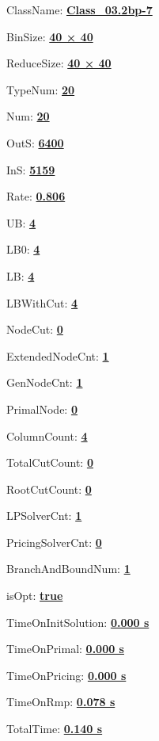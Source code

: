 \documentclass[11pt]{article}
\begin{document}
\pagestyle{empty}


ClassName: \underline{\textbf{Class_03.2bp-7}}
\par
BinSize: \underline{\textbf{40 × 40}}
\par
ReduceSize: \underline{\textbf{40 × 40}}
\par
TypeNum: \underline{\textbf{20}}
\par
Num: \underline{\textbf{20}}
\par
OutS: \underline{\textbf{6400}}
\par
InS: \underline{\textbf{5159}}
\par
Rate: \underline{\textbf{0.806}}
\par
UB: \underline{\textbf{4}}
\par
LB0: \underline{\textbf{4}}
\par
LB: \underline{\textbf{4}}
\par
LBWithCut: \underline{\textbf{4}}
\par
NodeCut: \underline{\textbf{0}}
\par
ExtendedNodeCnt: \underline{\textbf{1}}
\par
GenNodeCnt: \underline{\textbf{1}}
\par
PrimalNode: \underline{\textbf{0}}
\par
ColumnCount: \underline{\textbf{4}}
\par
TotalCutCount: \underline{\textbf{0}}
\par
RootCutCount: \underline{\textbf{0}}
\par
LPSolverCnt: \underline{\textbf{1}}
\par
PricingSolverCnt: \underline{\textbf{0}}
\par
BranchAndBoundNum: \underline{\textbf{1}}
\par
isOpt: \underline{\textbf{true}}
\par
TimeOnInitSolution: \underline{\textbf{0.000 s}}
\par
TimeOnPrimal: \underline{\textbf{0.000 s}}
\par
TimeOnPricing: \underline{\textbf{0.000 s}}
\par
TimeOnRmp: \underline{\textbf{0.078 s}}
\par
TotalTime: \underline{\textbf{0.140 s}}
\par
\newpage


\end{document}
